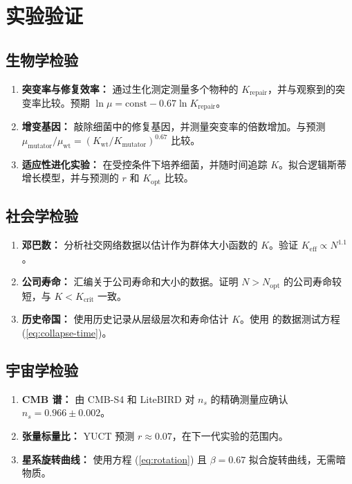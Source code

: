 \documentclass[12pt,a4paper]{article}
\theoremstyle{remark}
\newcommand{\Keff}{K_{\mathrm{eff}}}
\begin{document}
		\section{实验验证}
		\label{sec:experiments}
		
		\subsection{生物学检验}
		
		\begin{enumerate}
			\item \textbf{突变率与修复效率：} 通过生化测定测量多个物种的 $K_{\text{repair}}$，并与观察到的突变率比较。预期 $\ln \mu = \text{const} - 0.67 \ln K_{\text{repair}}$。
			\item \textbf{增变基因：} 敲除细菌中的修复基因，并测量突变率的倍数增加。与预测 $\mu_{\text{mutator}}/\mu_{\text{wt}} = (K_{\text{wt}}/K_{\text{mutator}})^{0.67}$ 比较。
			\item \textbf{适应性进化实验：} 在受控条件下培养细菌，并随时间追踪 $K$。拟合逻辑斯蒂增长模型，并与预测的 $r$ 和 $K_{\text{opt}}$ 比较。
		\end{enumerate}
		
		\subsection{社会学检验}
		
		\begin{enumerate}
			\item \textbf{邓巴数：} 分析社交网络数据以估计作为群体大小函数的 $K$。验证 $\Keff \propto N^{1.1}$。
			\item \textbf{公司寿命：} 汇编关于公司寿命和大小的数据。证明 $N > N_{\text{opt}}$ 的公司寿命较短，与 $K < K_{\text{crit}}$ 一致。
			\item \textbf{历史帝国：} 使用历史记录从层级层次和寿命估计 $K$。使用 \cite{TurchinNefedov2009} 的数据测试方程 (\ref{eq:collapse-time})。
		\end{enumerate}
		
		\subsection{宇宙学检验}
		
		\begin{enumerate}
			\item \textbf{CMB 谱：} 由 CMB-S4 和 LiteBIRD 对 $n_s$ 的精确测量应确认 $n_s = 0.966 \pm 0.002$。
			\item \textbf{张量标量比：} YUCT 预测 $r \approx 0.07$，在下一代实验的范围内。
			\item \textbf{星系旋转曲线：} 使用方程 (\ref{eq:rotation}) 且 $\beta = 0.67$ 拟合旋转曲线，无需暗物质。
		\end{enumerate}
		
\end{document}
